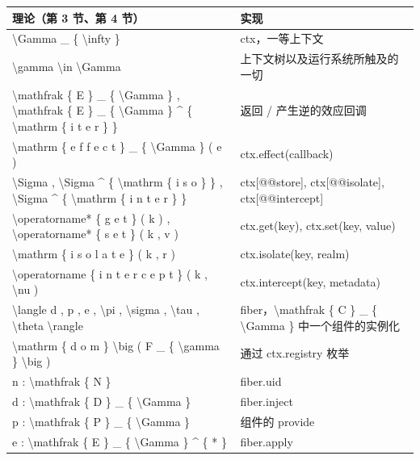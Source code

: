 {\def\LTcaptype{none} %
\begin{longtable}[]{@{}|l|l|@{}}
\toprule\noalign{}
\endhead
\bottomrule\noalign{}
\endlastfoot
\hline
理论（第 3 节、第 4 节） & 实现 \\
\hline
\textbackslash Gamma \_ \{ \textbackslash infty \} & ctx，一等上下文 \\
\hline
\textbackslash gamma \textbackslash in \textbackslash Gamma & 上下文树以及运行系统所触及的一切 \\
\hline
\textbackslash mathfrak \{ E \} \_ \{ \textbackslash Gamma \} , \textbackslash mathfrak \{ E \} \_ \{ \textbackslash Gamma \} \^{} \{ \textbackslash mathrm \{ i t e r \} \} & 返回 / 产生逆的效应回调 \\
\hline
\textbackslash mathrm \{ e f f e c t \} \_ \{ \textbackslash Gamma \} ( e ) & ctx.effect(callback) \\
\hline
\textbackslash Sigma , \textbackslash Sigma \^{} \{ \textbackslash mathrm \{ i s o \} \} , \textbackslash Sigma \^{} \{ \textbackslash mathrm \{ i n t e r \} \} & ctx{[}@@store{]}, ctx{[}@@isolate{]}, ctx{[}@@intercept{]} \\
\hline
\textbackslash operatorname* \{ g e t \} ( k ) , \textbackslash operatorname* \{ s e t \} ( k , v ) & ctx.get(key), ctx.set(key, value) \\
\hline
\textbackslash mathrm \{ i s o l a t e \} ( k , r ) & ctx.isolate(key, realm) \\
\hline
\textbackslash operatorname \{ i n t e r c e p t \} ( k , \textbackslash nu ) & ctx.intercept(key, metadata) \\
\hline
\textbackslash langle d , p , e , \textbackslash pi , \textbackslash sigma , \textbackslash tau , \textbackslash theta \textbackslash rangle & fiber，\textbackslash mathfrak \{ C \} \_ \{ \textbackslash Gamma \} 中一个组件的实例化 \\
\hline
\textbackslash mathrm \{ d o m \} \textbackslash big ( F \_ \{ \textbackslash gamma \} \textbackslash big ) & 通过 ctx.registry 枚举 \\
\hline
n : \textbackslash mathfrak \{ N \} & fiber.uid \\
\hline
d : \textbackslash mathfrak \{ D \} \_ \{ \textbackslash Gamma \} & fiber.inject \\
\hline
p : \textbackslash mathfrak \{ P \} \_ \{ \textbackslash Gamma \} & 组件的 provide \\
\hline
e : \textbackslash mathfrak \{ E \} \_ \{ \textbackslash Gamma \} \^{} \{ * \} & fiber.apply \\

\end{longtable}}
